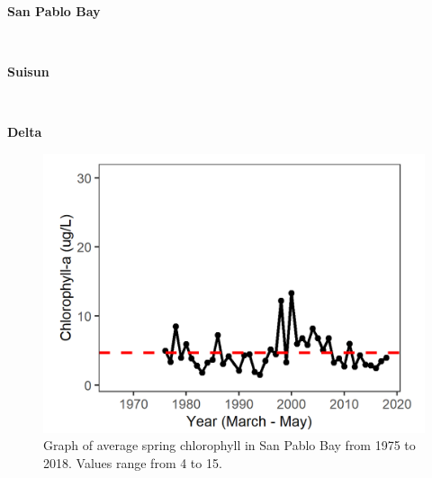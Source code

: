 \documentclass[
]{book}
\begin{document}
\begin{panel-grid}

\begin{columns-nocenter}

\begin{column800}

\textbf{San Pablo Bay}

\end{column800}

\begin{column40}

~

\end{column40}

\begin{column800}

\textbf{Suisun}

\end{column800}

\begin{column40}

~

\end{column40}

\begin{column800}

\textbf{Delta}

\end{column800}

\end{columns-nocenter}

\begin{columns-nocenter}

\begin{column800}

\begin{expand}

\begin{figure}
\includegraphics[width=15.25in]{figures/chla_splspring} \caption{Graph of average spring chlorophyll in San Pablo Bay from 1975 to 2018. Values range from 4 to 15.}\label{fig:unnamed-chunk-20}
\end{figure}


\end{expand}
\end{column800}
\end{columns-nocenter}
\end{panel-grid}
\end{document}
